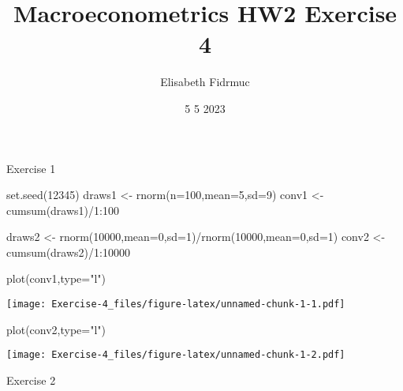 \documentclass[
]{article}
\title{Macroeconometrics HW2 Exercise 4}
\author{Elisabeth Fidrmuc}
\date{5 5 2023}
\newenvironment{Shaded}{\begin{snugshade}}{\end{snugshade}}
\newcommand{\AttributeTok}[1]{\textcolor[rgb]{0.77,0.63,0.00}{#1}}
\newcommand{\DecValTok}[1]{\textcolor[rgb]{0.00,0.00,0.81}{#1}}
\newcommand{\FunctionTok}[1]{\textcolor[rgb]{0.00,0.00,0.00}{#1}}
\newcommand{\NormalTok}[1]{#1}
\newcommand{\OtherTok}[1]{\textcolor[rgb]{0.56,0.35,0.01}{#1}}
\newcommand{\SpecialCharTok}[1]{\textcolor[rgb]{0.00,0.00,0.00}{#1}}
\newcommand{\StringTok}[1]{\textcolor[rgb]{0.31,0.60,0.02}{#1}}
\begin{document}
\maketitle

Exercise 1

\begin{Shaded}
\begin{Highlighting}[]
\FunctionTok{set.seed}\NormalTok{(}\DecValTok{12345}\NormalTok{)}
\NormalTok{draws1 }\OtherTok{\textless{}{-}} \FunctionTok{rnorm}\NormalTok{(}\AttributeTok{n=}\DecValTok{100}\NormalTok{,}\AttributeTok{mean=}\DecValTok{5}\NormalTok{,}\AttributeTok{sd=}\DecValTok{9}\NormalTok{)}
\NormalTok{conv1 }\OtherTok{\textless{}{-}} \FunctionTok{cumsum}\NormalTok{(draws1)}\SpecialCharTok{/}\DecValTok{1}\SpecialCharTok{:}\DecValTok{100}

\NormalTok{draws2 }\OtherTok{\textless{}{-}} \FunctionTok{rnorm}\NormalTok{(}\DecValTok{10000}\NormalTok{,}\AttributeTok{mean=}\DecValTok{0}\NormalTok{,}\AttributeTok{sd=}\DecValTok{1}\NormalTok{)}\SpecialCharTok{/}\FunctionTok{rnorm}\NormalTok{(}\DecValTok{10000}\NormalTok{,}\AttributeTok{mean=}\DecValTok{0}\NormalTok{,}\AttributeTok{sd=}\DecValTok{1}\NormalTok{)}
\NormalTok{conv2 }\OtherTok{\textless{}{-}} \FunctionTok{cumsum}\NormalTok{(draws2)}\SpecialCharTok{/}\DecValTok{1}\SpecialCharTok{:}\DecValTok{10000}

\FunctionTok{plot}\NormalTok{(conv1,}\AttributeTok{type=}\StringTok{"l"}\NormalTok{)}
\end{Highlighting}
\end{Shaded}

\texttt{[image: Exercise-4\_files/figure-latex/unnamed-chunk-1-1.pdf]}

\begin{Shaded}
\begin{Highlighting}[]
\FunctionTok{plot}\NormalTok{(conv2,}\AttributeTok{type=}\StringTok{"l"}\NormalTok{)}
\end{Highlighting}
\end{Shaded}

\texttt{[image: Exercise-4\_files/figure-latex/unnamed-chunk-1-2.pdf]}

Exercise 2
\end{document}
